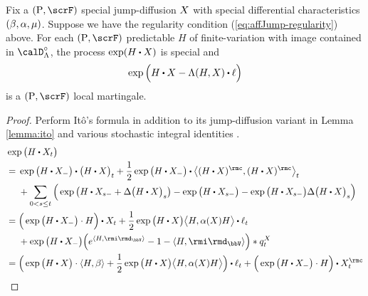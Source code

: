 \begin{theorem}
  \label{theorem:LK-exponential-martingale}
  Fix a $(\Prb, \scrF)$ special jump-diffusion $X$ with special differential characteristics $(\beta, \alpha, \mu)$.
  Suppose we have the regularity condition (\ref{eq:affJump-regularity}) above.
  For each $(\Prb, \scrF)$ predictable $H$ of finite-variation with image contained in $\odeSpace^\circ$, the process $\exp(H \shortInt \X)$ is special and 
  \[
    \exp\Big(H \shortInt \X - \ode(H, \X) \shortInt \leb\Big)
  \]
  is a $(\Prb, \scrF)$ local martingale.
\end{theorem}
\begin{proof}
  \label{proof:theorem:LK-exponential-martingale}
  Perform It\^o's formula \cite[Theoerem I.4.57]{jacod2003} in addition to its jump-diffusion variant in Lemma \ref{lemma:ito} and various stochastic integral identities \cite[Remarks I.4.36, I.4.37, Theorem I.4.40(d), Proposition II.1.30(b)]{jacod2003}.
  \begin{align}
    \notag
    &\exp\big( H \shortInt \X_t \big) \\
    \notag
    &= \begin{aligned}[t]
      &\exp\big( H \shortInt \X_- \big) \shortInt \big( H \shortInt \X \big)_t + \frac12 \exp\big( H \shortInt \X_- \big) \shortInt \bprj{(H\shortInt \X)^\rmc}{(H\shortInt\X)^\rmc}_t \\
      &+ \sum_{0<s\leq t} \Big( \exp\big(H \shortInt \X_{s-} + \Delta\big(H \shortInt \X\big)_s \big) - \exp\big(H\shortInt \X_{s-}\big) - \exp\big(H \shortInt\X_{s-}\big) \Delta \big(H \shortInt \X\big)_s\Big)
    \end{aligned} \\
    \notag
    &= \begin{aligned}[t]
      &\Big(\exp\big( H \shortInt \X_- \big) \cdot H \Big) \shortInt \X_t + \frac12 \exp\big( H \shortInt \X \big) \bprj{H}{\affDiff(\X)H} \shortInt \leb_t \\
      &+ \exp\big(H\shortInt\X_-\big) \Big( e^{\prj{H}{\id_\vecSpace}} - 1 - \prj{H}{\id_\vecSpace} \Big) \ast \jumpMeas^\X_t
    \end{aligned} \\
    \label{eq:LK-exp-ito-pause}
    &= \begin{aligned}[t]
      &\Big(\exp\big( H \shortInt \X \big) \cdot \prj{H}{\affDrift} + \frac12 \exp\big( H \shortInt \X \big) \bprj{H}{\affDiff(\X)H} \Big) \shortInt \leb_t + \Big( \exp\big( H \shortInt \X_- \big) \cdot H \Big) \shortInt \X^\rmc_t \\

\end{aligned}
\end{align}
\end{proof}
